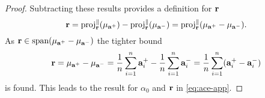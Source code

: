 \begin{proof}
    Subtracting these results provides a definition for $\mathbf{r}$
    \begin{equation*}
        \mathbf{r} = \text{proj}_{\mathbf{r}}^{\parallel}(\mu_{\mathbf{a}^+}) - \text{proj}_{\mathbf{r}}^{\parallel}(\mu_{\mathbf{a}^-}) = \text{proj}_{\mathbf{r}}^{\parallel}(\mu_{\mathbf{a}^+} - \mu_{\mathbf{a}^-}).
    \end{equation*}
    As $\mathbf{r} \in \text{span}(\mu_{\mathbf{a}^+} - \mu_{\mathbf{a}^-})$ the tighter bound
    \begin{equation*}
        \mathbf{r} = \mu_{\mathbf{a}^+} - \mu_{\mathbf{a}^-} = \frac{1}{n}\sum_{i=1}^{n}\mathbf{a}_i^+ - \frac{1}{n}\sum_{i=1}^{n}\mathbf{a}_i^- = \frac{1}{n}\sum_{i=1}^{n}(\mathbf{a}_i^+ - \mathbf{a}_i^-)
    \end{equation*}
    is found.
    This leads to the result for $\alpha_0$ and $\mathbf{r}$ in \cref{eq:ace-app}.
\end{proof}
